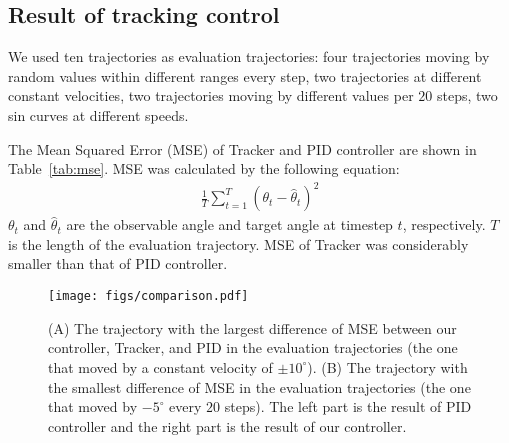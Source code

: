 \documentclass[letterpaper, 10 pt, conference]{ieeeconf}  %
\newcommand{\tabref}{Table~\ref}
\begin{document}
\subsection{Result of tracking control}

\begin{table}[tb]
    \caption{Tracker and PID controller's results of tracking $10$ same target trajectories including linear and nonlinear}
    \label{tab:mse}
    \begin{center}
    \end{center}
\end{table}

We used ten trajectories as evaluation trajectories: four trajectories moving by random values within different ranges every step, two trajectories at different constant velocities, two trajectories moving by different values per $20$ steps, two sin curves at different speeds.

The Mean Squared Error (MSE) of Tracker and PID controller are shown in \tabref{tab:mse}. MSE was calculated by the following equation:
\begin{equation}
\begin{split}
    \frac{1}{T} \sum_{t=1}^{T} ( \theta_t -  \hat{\theta}_{t} )^2
\end{split}
\end{equation}
$\theta_t$ and $\hat{\theta}_t$ are the observable angle and target angle at timestep $t$, respectively. $T$ is the length of the evaluation trajectory.
MSE of Tracker was considerably smaller than that of PID controller.

\begin{figure}[tb]
\begin{center}
    \texttt{[image: figs/comparison.pdf]}
    \caption{(A) The trajectory with the largest difference of MSE between our controller, Tracker, and PID in the evaluation trajectories (the one that moved by a constant velocity of $\pm 10^\circ$).
    (B) The trajectory with the smallest difference of MSE in the evaluation trajectories (the one that moved by $-5^\circ$ every $20$ steps).
    The left part is the result of PID controller and the right part is the result of our controller. }
    \label{fig:a}
\end{center}
\end{figure}
\end{document}
